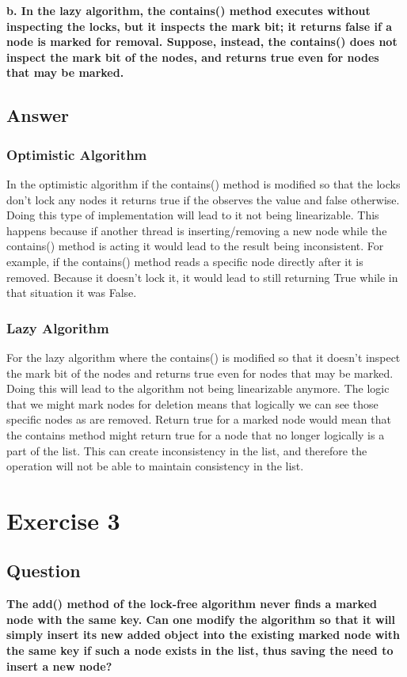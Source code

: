 \documentclass{article}
\begin{document}
\textbf{b. In the lazy algorithm, the contains() method executes without inspecting the locks, but it inspects the mark bit; it returns false if a node is marked for removal. Suppose, instead, the contains() does not inspect the mark bit of the nodes, and returns true even for nodes that may be marked.}

\subsection*{Answer}
\subsubsection*{Optimistic Algorithm}
In the optimistic algorithm if the contains() method is modified so that the locks don't lock any nodes it returns true if the observes the value and false otherwise. Doing this type of implementation will lead to it not being linearizable. This happens because if another thread is inserting/removing a new node while the contains() method is acting it would lead to the result being inconsistent. For example, if the contains() method reads a specific node directly after it is removed. Because it doesn't lock it, it would lead to still returning True while in that situation it was False.

\subsubsection*{Lazy Algorithm}
For the lazy algorithm where the contains() is modified so that it doesn't inspect the mark bit of the nodes and returns true even for nodes that may be marked. Doing this will lead to the algorithm not being linearizable anymore. The logic that we might mark nodes for deletion means that logically we can see those specific nodes as are removed. Return true for a marked node would mean that the contains method might return true for a node that no longer logically is a part of the list. This can create inconsistency in the list, and therefore the operation will not be able to maintain consistency in the list.





\section*{Exercise 3}
\subsection*{Question}
\textbf{The add() method of the lock-free algorithm never finds a marked node with the same key. Can one modify the algorithm so that it will simply insert its new added object into the existing marked node with the same key if such a node exists in the list, thus saving the need to insert a new node?}
\end{document}
